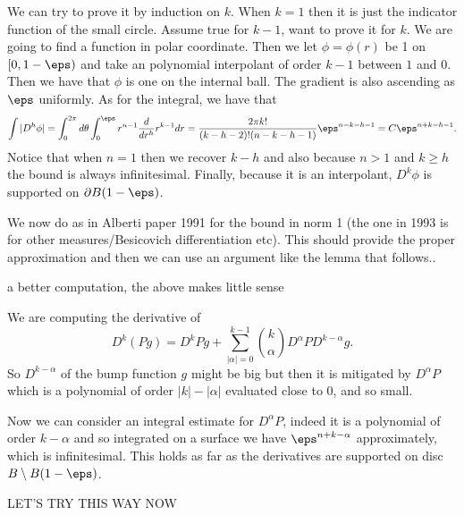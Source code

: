 We can try to prove it by induction on $k$. When $k=1$ then it is just the indicator function of the small circle. Assume true for $k-1$, want to prove it for $k$. We are going to find a function in polar coordinate.  Then we let $\phi=\phi(r)$ be 1 on $[0,1-\eps)$ and take an polynomial interpolant of order $k-1$ between $1$ and $0$. Then we have that $\phi$ is one on the internal ball. The gradient is also ascending as $\eps$ uniformly. As for the integral, we have that
\begin{equation}
\int |D^h \phi| = \int_0^{2\pi}d\theta \int_0^\eps r^{n-1}  \frac{d}{dr^h} r^{k-1} dr = \frac{2\pi k!}{(k-h-2)!(n-k-h-1)} \eps^{n-k-h-1} = C \eps^{n+k-h-1}.
\end{equation}
Notice that when $n=1$ then we recover $k-h$ and also because $n> 1$ and $k\geq h$ the bound is always infinitesimal. Finally, because it is an interpolant, $D^k \phi$ is supported on $\partial B(1-\eps)$.

We now do as in Alberti paper 1991 for the bound in norm 1 (the one in 1993 is for other measures/Besicovich differentiation etc). This should provide the proper approximation and then we can use an argument like the lemma that follows..

{\color{purple} a better computation, the above makes little sense}

We are computing the derivative of
\begin{equation}
D^k (P g) = D^k P g + \sum_{|\alpha|=0}^{k-1} {k \choose \alpha} D^\alpha P D^{k-\alpha} g.
\end{equation}
So $D^{k-\alpha}$ of the bump function $g$ might be big but then it is mitigated by $D^\alpha P$ which is a polynomial of order $|k|-|\alpha|$ evaluated close to $0$, and so small.

Now we can consider an integral estimate for $D^\alpha P$, indeed it is a polynomial of order $k-\alpha$ and so integrated on a surface we have $\eps^{n+k-\alpha}$ approximately, which is infinitesimal. This holds as far as the derivatives are supported on disc $B\setminus B(1-\eps)$.

\hspace{3cm}

{\color{red} LET'S TRY THIS WAY NOW}


